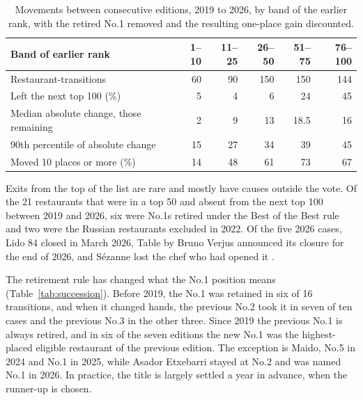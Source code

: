 \documentclass[11pt,a4paper]{article}
\begin{document}
\begin{table}[t]
\caption{Movements between consecutive editions, 2019 to 2026, by band of the earlier rank, with the retired No.1 removed and the resulting one-place gain discounted.}
\label{tab:bands}
\small
\begin{tabular*}{\textwidth}{@{\extracolsep{\fill}}lrrrrr@{}}
\toprule
Band of earlier rank & 1--10 & 11--25 & 26--50 & 51--75 & 76--100 \\
\midrule
Restaurant-transitions & 60 & 90 & 150 & 150 & 144 \\
Left the next top 100 (\%) & 5 & 4 & 6 & 24 & 45 \\
Median absolute change, those remaining & 2 & 9 & 13 & 18.5 & 16 \\
90th percentile of absolute change & 15 & 27 & 34 & 39 & 45 \\
Moved 10 places or more (\%) & 14 & 48 & 61 & 73 & 67 \\
\bottomrule
\end{tabular*}
\end{table}

Exits from the top of the list are rare and mostly have causes outside the vote. Of the 21 restaurants that were in a top 50 and absent from the next top 100 between 2019 and 2026, six were No.1s retired under the Best of the Best rule and two were the Russian restaurants excluded in 2022. Of the five 2026 cases, Lido 84 closed in March 2026, Table by Bruno Verjus announced its closure for the end of 2026, and S\'ezanne lost the chef who had opened it \citep{lido84closure,tableclosure,sezanne2026}.

The retirement rule has changed what the No.1 position means (Table~\ref{tab:succession}). Before 2019, the No.1 was retained in six of 16 transitions, and when it changed hands, the previous No.2 took it in seven of ten cases and the previous No.3 in the other three. Since 2019 the previous No.1 is always retired, and in six of the seven editions the new No.1 was the highest-placed eligible restaurant of the previous edition. The exception is Maido, No.5 in 2024 and No.1 in 2025, while Asador Etxebarri stayed at No.2 and was named No.1 in 2026. In practice, the title is largely settled a year in advance, when the runner-up is chosen.
\end{document}
